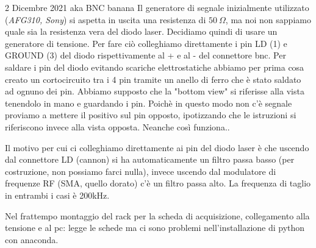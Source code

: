 \documentclass{article}
\numberwithin{equation}{section}
\begin{document}
\begin{section}{2 Dicembre 2021 aka BNC banana}
Il generatore di segnale inizialmente utilizzato (\textit{AFG310, Sony}) si aspetta in uscita una resistenza di $50~\Omega$, ma noi non sappiamo quale sia la resistenza vera del diodo laser. Decidiamo quindi di usare un generatore di tensione.
Per fare ciò colleghiamo direttamente i pin LD (1) e GROUND (3) del diodo rispettivamente al + e al - del connettore bnc. Per saldare i pin del diodo evitando scariche elettrostatiche abbiamo per prima cosa creato un cortocircuito tra i 4 pin tramite un anello di ferro che è stato saldato ad ognuno dei pin. 
Abbiamo supposto che la "bottom view" si riferisse alla vista tenendolo in mano e guardando i pin. Poichè in questo modo non c'è segnale proviamo a mettere il positivo sul pin opposto, ipotizzando che le istruzioni si riferiscono invece alla vista opposta.
Neanche così funziona..

Il motivo per cui ci colleghiamo direttamente ai pin del diodo laser è che uscendo dal connettore LD (cannon) si ha automaticamente un filtro passa basso (per costruzione, non possiamo farci nulla), invece uscendo dal modulatore di frequenze RF (SMA, quello dorato) c'è un filtro passa alto. La frequenza di taglio in entrambi i casi è 200kHz.

Nel frattempo montaggio del rack per la scheda di acquisizione, collegamento alla tensione e al pc: legge le schede ma ci sono problemi nell'installazione di python con anaconda.
\end{section}
\end{document}
